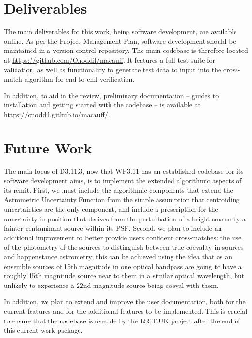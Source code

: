 \documentclass[a4paper,11pt]{scrartcl}
\begin{document}
\section{Deliverables}
The main deliverables for this work, being software development, are available online.
As per the Project Management Plan, software development should be maintained in a version control repository.
The main codebase is therefore located at \href{https://github.com/Onoddil/macauff}{https://github.com/Onoddil/macauff}.
It features a full test suite for validation, as well as functionality to generate test data to input into the cross-match algorithm for end-to-end verification.

In addition, to aid in the review, preliminary documentation -- guides to installation and getting started with the codebase -- is available at \href{https://onoddil.github.io/macauff/}{https://onoddil.github.io/macauff/}.

\section{Future Work}
The main focus of D3.11.3, now that WP3.11 has an established codebase for its software development aims, is to implement the extended algorithmic aspects of its remit.
First, we must include the algorithmic components that extend the Astrometric Uncertainty Function from the simple assumption that centroiding uncertainties are the only component, and include a prescription for the uncertainty in position that derives from the perturbation of a bright source by a fainter contaminant source within its PSF.
Second, we plan to include an additional improvement to better provide users confident cross-matches: the use of the photometry of the sources to distinguish between true coevality in sources and happenstance astrometry; this can be achieved using the idea that as an ensemble sources of 15th magnitude in one optical bandpass are going to have a roughly 15th magnitude source near to them in a similar optical wavelength, but unlikely to experience a 22nd magnitude source being coeval with them.

In addition, we plan to extend and improve the user documentation, both for the current features and for the additional features to be implemented.
This is crucial to ensure that the codebase is useable by the LSST:UK project after the end of this current work package.
\end{document}
